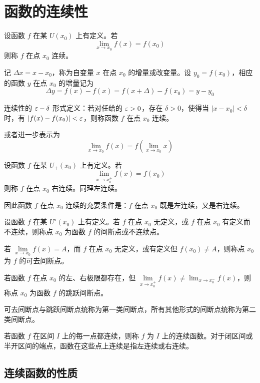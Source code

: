 \section{函数的连续性}

\begin{definition}[连续性]
	设函数 $f$ 在某 $U(x_0)$ 上有定义。若
	\[ \lim_{x\to x_0}f(x) = f(x_0) \]
	则称 $f$ 在点 $x_0$ 连续。
\end{definition}

记 $\Delta x = x-x_0$，称为自变量 $x$ 在点 $x_0$ 的增量或改变量。设 $y_0=f(x_0)$，相应的函数 $y$ 在点 $x_0$ 的增量记为
\[ \Delta y = f(x)-f(x) = f(x+\Delta)-f(x_0) = y-y_0 \]

连续性的 $\varepsilon-\delta$ 形式定义：若对任给的 $\varepsilon>0$，存在 $\delta>0$，使得当 $|x-x_0|<\delta$ 时，有 $|f(x)-f(x_0)|<\varepsilon$，则称函数 $f$ 在点 $x_0$ 连续。

或者进一步表示为
\[ \lim_{x\to x_0}f(x) = f\left(\lim_{x\to x_0}x\right) \]

\begin{definition}
	设函数 $f$ 在某 $U_+(x_0)$ 上有定义。若
	\[ \lim_{x\to x_0^+}f(x) = f(x_0) \]
	则称 $f$ 在点 $x_0$ 右连续。同理左连续。
\end{definition}

因此函数 $f$ 在点 $x_0$ 连续的充要条件是：$f$ 在点 $x_0$ 既是左连续，又是右连续。

\begin{definition}[间断点]
	设函数 $f$ 在某 $U^\circ(x_0)$ 上有定义。若 $f$ 在点 $x_0$ 无定义，或 $f$ 在点 $x_0$ 有定义而不连续，则称点 $x_0$ 为函数 $f$ 的间断点或不连续点。
\end{definition}

若 $\lim\limits_{x\to x_0}f(x)=A$，而 $f$ 在点 $x_0$ 无定义，或有定义但 $f(x_0)\ne A$，则称点 $x_0$ 为 $f$ 的可去间断点。

若函数 $f$ 在点 $x_0$ 的左、右极限都存在，但 $\lim\limits_{x\to x_0^+}f(x) \ne \lim_{x\to x_0^-}f(x)$，则称点 $x_0$ 为函数 $f$ 的跳跃间断点。

可去间断点与跳跃间断点统称为第一类间断点，所有其他形式的间断点统称为第二类间断点。

若函数 $f$ 在区间 $I$ 上的每一点都连续，则称 $f$ 为 $I$ 上的连续函数。对于闭区间或半开区间的端点，函数在这些点上连续是指左连续或右连续。

\subsection{连续函数的性质}

